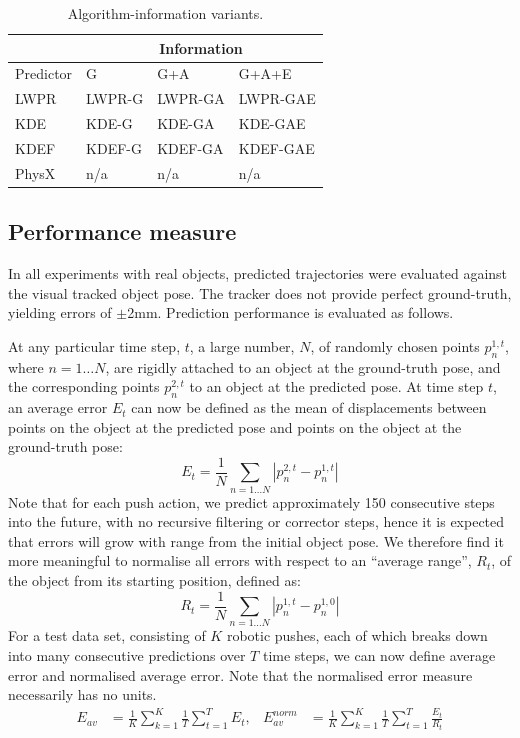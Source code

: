 \begin{table}[b]
\begin{center}
\begin{tabular}{|l|l|l|l|}\hline
 & \multicolumn{3}{|c|}{Information} \\ \hline
Predictor & G & G+A & G+A+E \\ \hline
LWPR & LWPR-G& LWPR-GA & LWPR-GAE \\ \hline
KDE & KDE-G & KDE-GA & KDE-GAE \\ \hline
KDEF & KDEF-G & KDEF-GA & KDEF-GAE \\ \hline
PhysX & n/a & n/a & n/a \\ \hline
\end{tabular}
\caption{Algorithm-information variants. \label{tab:algs}}
\end{center}
\end{table}
\subsection{Performance measure}\label{sec:Experiment.Performance}

In all experiments with real objects, predicted trajectories were evaluated against the visual tracked object pose. The tracker does not provide perfect ground-truth, yielding errors of $\pm$2mm. Prediction performance is evaluated as follows.

At any particular time step, $t$, a large number, $N$, of randomly chosen points $p_{n}^{1,t}$, where $n=1 \ldots N$, are rigidly attached to an object at the ground-truth pose, and the corresponding points $p_{n}^{2,t}$ to an object at the predicted pose. At time step $t$, an average error $E_t$ can now be defined as the mean of displacements between points on the object at the predicted pose and points on the object at the ground-truth pose:
\begin{equation}
E_t = \frac{1}{N} \mathop{\sum}_{n=1 \ldots N}|p_{n}^{2,t}-p_{n}^{1,t}|
\label{eq:defn_Rt}
\end{equation}
Note that for each push action, we predict approximately 150
consecutive steps into the future, with no recursive filtering or
corrector steps, hence it is expected that errors will grow with range
from the initial object pose. We therefore find it more meaningful to
normalise all errors with respect to an ``average range'', $R_t$, of
the object from its starting position, defined as:
\begin{equation}
R_t = \frac{1}{N} \mathop{\sum}_{n=1 \ldots N}|p_{n}^{1,t}-p_{n}^{1,0}|
\label{eq:defn_Et}
\end{equation}
For a test data set, consisting of $K$ robotic pushes, each of which breaks down into many consecutive predictions over $T$ time steps, we can now define average error and normalised average error. Note that the normalised error measure necessarily has no units.
\begin{align}
E_{av} &= \frac{1}{K} \mathop{\sum}_{k=1}^{K} \frac{1}{T} \mathop{\sum}_{t=1}^{T} E_t,
&E_{av}^{norm} &= \frac{1}{K} \mathop{\sum}_{k=1}^{K} \frac{1}{T} \mathop{\sum}_{t=1}^{T} \frac{E_t}{R_t}
\label{eq:Error1}
\end{align}


